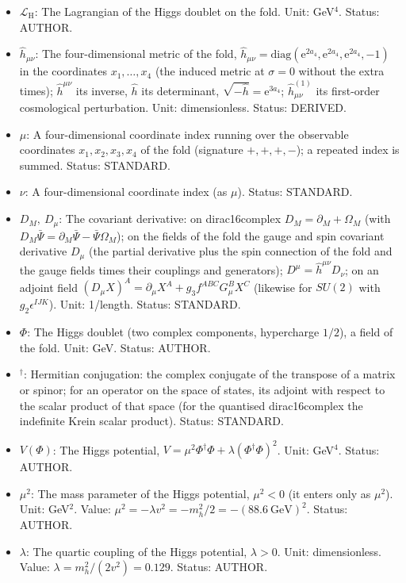 \documentclass[
  10pt,
]{article}
\providecommand{\tightlist}{%
  \setlength{\itemsep}{0pt}\setlength{\parskip}{0pt}}
\begin{document}
\begin{itemize}
\tightlist
\item
  \(\mathcal{L}_{\mathrm{H}}\): The Lagrangian of the Higgs doublet on
  the fold. Unit: GeV\(^4\). Status: AUTHOR.
\item
  \(\hat h_{\mu\nu}\): The four-dimensional metric of the fold,
  \(\hat h_{\mu\nu} = \mathrm{diag}(\mathrm{e}^{2a_4}, \mathrm{e}^{2a_4}, \mathrm{e}^{2a_4}, -1)\)
  in the coordinates \(x_1, \dots, x_4\) (the induced metric at
  \(\sigma = 0\) without the extra times); \(\hat h^{\mu\nu}\) its
  inverse, \(\hat h\) its determinant,
  \(\sqrt{-\hat h} = \mathrm{e}^{3a_4}\); \(\hat h^{(1)}_{\mu\nu}\) its
  first-order cosmological perturbation. Unit: dimensionless. Status:
  DERIVED.
\item
  \(\mu\): A four-dimensional coordinate index running over the
  observable coordinates \(x_1, x_2, x_3, x_4\) of the fold (signature
  \(+,+,+,-\)); a repeated index is summed. Status: STANDARD.
\item
  \(\nu\): A four-dimensional coordinate index (as \(\mu\)). Status:
  STANDARD.
\item
  \(D_M,\ D_\mu\): The covariant derivative: on dirac16complex
  \(D_M = \partial_M + \Omega_M\) (with
  \(D_M\bar\Psi = \partial_M\bar\Psi - \bar\Psi\Omega_M\)); on the
  fields of the fold the gauge and spin covariant derivative \(D_\mu\)
  (the partial derivative plus the spin connection of the fold and the
  gauge fields times their couplings and generators);
  \(D^\mu = \hat h^{\mu\nu}D_\nu\); on an adjoint field
  \((D_\mu X)^A = \partial_\mu X^A + g_3f^{ABC}G^B_\mu X^C\) (likewise
  for \(SU(2)\) with \(g_2\epsilon^{IJK}\)). Unit: 1/length. Status:
  STANDARD.
\item
  \(\Phi\): The Higgs doublet (two complex components, hypercharge
  \(1/2\)), a field of the fold. Unit: GeV. Status: AUTHOR.
\item
  \({}^\dagger\): Hermitian conjugation: the complex conjugate of the
  transpose of a matrix or spinor; for an operator on the space of
  states, its adjoint with respect to the scalar product of that space
  (for the quantised dirac16complex the indefinite Krein scalar
  product). Status: STANDARD.
\item
  \(V(\Phi)\): The Higgs potential,
  \(V = \mu^2\Phi^\dagger\Phi + \lambda(\Phi^\dagger\Phi)^2\). Unit:
  GeV\(^4\). Status: AUTHOR.
\item
  \(\mu^2\): The mass parameter of the Higgs potential, \(\mu^2 < 0\)
  (it enters only as \(\mu^2\)). Unit: GeV\(^2\). Value:
  \(\mu^2 = -\lambda v^2 = -m_h^2/2 = -(88.6\ \mathrm{GeV})^2\). Status:
  AUTHOR.
\item
  \(\lambda\): The quartic coupling of the Higgs potential,
  \(\lambda > 0\). Unit: dimensionless. Value:
  \(\lambda = m_h^2/(2v^2) = 0.129\). Status: AUTHOR.
\end{itemize}
\end{document}
